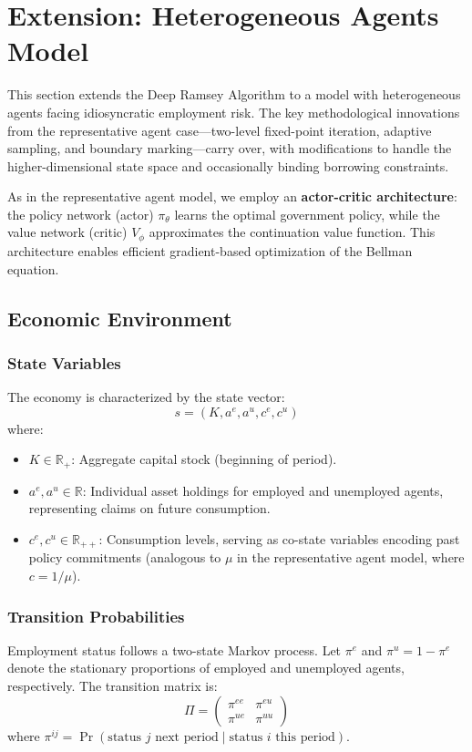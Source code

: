\section{Extension: Heterogeneous Agents Model}

This section extends the Deep Ramsey Algorithm to a model with heterogeneous agents facing idiosyncratic employment risk. The key methodological innovations from the representative agent case---two-level fixed-point iteration, adaptive sampling, and boundary marking---carry over, with modifications to handle the higher-dimensional state space and occasionally binding borrowing constraints.

As in the representative agent model, we employ an \textbf{actor-critic architecture}: the policy network (actor) $\pi_\theta$ learns the optimal government policy, while the value network (critic) $V_\phi$ approximates the continuation value function. This architecture enables efficient gradient-based optimization of the Bellman equation.

\subsection{Economic Environment}

\subsubsection{State Variables}
The economy is characterized by the state vector:
\begin{equation}
    s = (K, a^e, a^u, c^e, c^u)
\end{equation}
where:
\begin{itemize}
    \item $K \in \mathbb{R}_+$: Aggregate capital stock (beginning of period).
    \item $a^e, a^u \in \mathbb{R}$: Individual asset holdings for employed and unemployed agents, representing claims on future consumption.
    \item $c^e, c^u \in \mathbb{R}_{++}$: Consumption levels, serving as co-state variables encoding past policy commitments (analogous to $\mu$ in the representative agent model, where $c = 1/\mu$).
\end{itemize}

\subsubsection{Transition Probabilities}
Employment status follows a two-state Markov process. Let $\pi^e$ and $\pi^u = 1 - \pi^e$ denote the stationary proportions of employed and unemployed agents, respectively. The transition matrix is:
\begin{equation}
    \Pi = \begin{pmatrix} \pi^{ee} & \pi^{eu} \\ \pi^{ue} & \pi^{uu} \end{pmatrix}
\end{equation}
where $\pi^{ij} = \Pr(\text{status } j \text{ next period} \mid \text{status } i \text{ this period})$.

